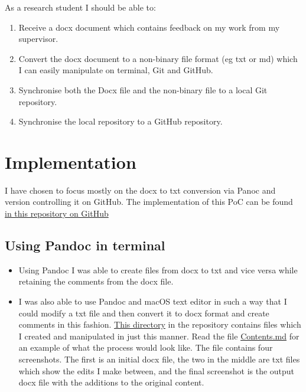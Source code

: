 \documentclass{article}
\begin{document}
As a research student I should be able to:

\begin{enumerate}
    \item Receive a docx document which contains feedback on my work from my supervisor.
    \item Convert the docx document to a non-binary file format (eg txt or md) which I can easily manipulate on terminal, Git and GitHub.
    \item Synchronise both the Docx file and the non-binary file to a local Git repository.
    \item Synchronise the local repository to a GitHub repository.
\end{enumerate}

\section{Implementation}

I have chosen to focus mostly on the docx to txt conversion via Panoc and version controlling it on GitHub. The implementation of this PoC can be found \href{https://github.com/MQ-FOAR705/Version-Control-Supervisor-Feedback-PoC}{in this repository on GitHub}

\subsection{Using Pandoc in terminal}

\begin{itemize}
    \item Using Pandoc I was able to create files from docx to txt and vice versa while retaining the comments from the docx file.
    \item I was also able to use Pandoc and macOS text editor in such a way that I could modify a txt file and then convert it to docx format and create comments in this fashion. \href{https://github.com/MQ-FOAR705/Version-Control-Supervisor-Feedback-PoC/tree/master/aa}{This directory} in the repository contains files which I created and manipulated in just this manner. Read the file \href{https://github.com/MQ-FOAR705/Version-Control-Supervisor-Feedback-PoC/blob/master/aa/Contents.md}{Contents.md} for an example of what the process would look like. The file contains four screenshots. The first is an initial docx file, the two in the middle are txt files which show the edits I make between, and the final screenshot is the output docx file with the additions to the original content.
\end{itemize}
\end{document}
